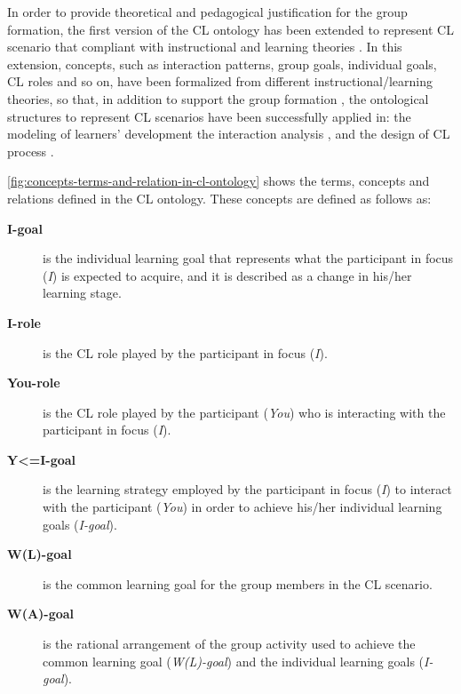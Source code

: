 In order to provide theoretical and pedagogical justification for the group formation, the first version of the CL ontology has been extended to represent CL scenario that compliant with instructional and learning theories \cite{InabaMizoguchi2004,IsotaniMizoguchiIsotaniCapeliIsotanideAlbuquerqueBittencourtJaques2013}. In this extension, concepts, such as interaction patterns, group goals, individual goals, CL roles and so on, have been formalized from different instructional/learning theories, so that, in addition to support the group formation \cite{IsotaniMizoguchi2008}, the ontological structures to represent CL scenarios have been successfully applied in: the modeling of learners' development \cite{InabaIkedaMizoguchi2003} the interaction analysis \cite{InabaOhkuboIkedaMizoguchi2002}, and the design of CL process \cite{IsotaniMizoguchiIsotaniCapeliIsotanideAlbuquerqueBittencourtJaques2013}.

\autoref{fig:concepts-terms-and-relation-in-cl-ontology} shows the terms, concepts and relations defined in the CL ontology. These concepts are defined as follows as:

\begin{description}
 \item[\textbf{I-goal}] is the individual learning goal that represents what the participant in focus (\emph{I}) is expected to acquire, and it is described as a change in his/her learning stage.

 \item[\textbf{I-role}] is the CL role played by the participant in focus (\emph{I}).

 \item[\textbf{You-role}] is the CL role played by the participant (\emph{You}) who is interacting with the participant in focus (\emph{I}).

 \item[\textbf{Y<=I-goal}] is the learning strategy employed by the participant in focus (\emph{I}) to interact with the participant (\emph{You}) in order to achieve his/her individual learning goals (\emph{I-goal}).

 \item[\textbf{W(L)-goal}] is the common learning goal for the group members in the CL scenario.

 \item[\textbf{W(A)-goal}] is the rational arrangement of the group activity used to achieve the common learning goal (\emph{W(L)-goal}) and the individual learning goals (\emph{I-goal}).
\end{description}

